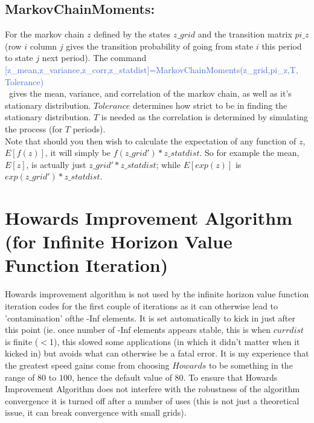 \documentclass[11pt,fleqn]{article}
\begin{document}
\subsection{MarkovChainMoments:}
For the markov chain $z$ defined by the states $z\_{}grid$ and the transition matrix $pi\_{}z$ (row $i$ column $j$ gives the transition probability of going from state $i$ this period to state $j$ next period). The command
\\ \indent \textcolor{RoyalBlue}{[z\_{}mean,z\_{}variance,z\_{}corr,z\_{}statdist]=MarkovChainMoments(z\_{}grid,pi\_{}z,T, Tolerance)}
\\\ gives the mean, variance, and correlation of the markov chain, as well as it's stationary distribution. $Tolerance$ determines how strict to be in finding the stationary distribution. $T$ is needed as the correlation is determined by simulating the process (for $T$ periods).
\\ Note that should you then wish to calculate the expectation of any function of $z$, $E[f(z)]$, it will simply be $f(z\_{}grid')*z\_{}statdist$. So for example the mean, $E[z]$, is actually just $z\_{}grid'*z\_{}statdist$; while $E[exp(z)]$ is $exp(z\_{}grid')*z\_{}statdist$.

\newpage

% 

\section{Howards Improvement Algorithm (for Infinite Horizon Value Function Iteration)}
Howards improvement algorithm is not used by the infinite horizon value function iteration codes for the first couple of iterations as it can otherwise lead to 'contamination' ofthe -Inf elements. It is set automatically to kick in just after this point (ie. once number of -Inf elements appears stable, this is when $currdist$ is finite ($<$1), this slowed some applications (in which it didn't matter when it kicked in) but avoids what can otherwise be a fatal error. It is my experience that the greatest speed gains come from choosing $Howards$ to be something in the range of $80$ to $100$, hence the default value of $80$. To ensure that Howards Improvement Algorithm does not interfere with the robustness of the algorithm convergence it is turned off after a number of uses (this is not just a theoretical issue, it can break convergence with small grids).
\end{document}
